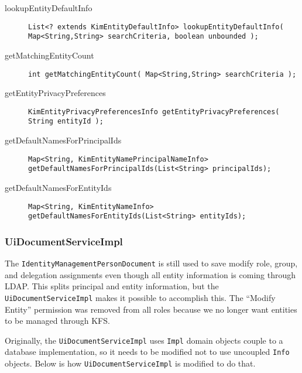\documentclass[12pt,notitlepage]{article}
\begin{document}
\begin{description}
\item[lookupEntityDefaultInfo]
\begin{lstlisting}
List<? extends KimEntityDefaultInfo> lookupEntityDefaultInfo( Map<String,String> searchCriteria, boolean unbounded );
\end{lstlisting}

\item[getMatchingEntityCount]
\begin{lstlisting}
int getMatchingEntityCount( Map<String,String> searchCriteria );
\end{lstlisting}

\item[getEntityPrivacyPreferences]
\begin{lstlisting}
KimEntityPrivacyPreferencesInfo getEntityPrivacyPreferences( String entityId );
\end{lstlisting}

\item[getDefaultNamesForPrincipalIds]
\begin{lstlisting}
Map<String, KimEntityNamePrincipalNameInfo> getDefaultNamesForPrincipalIds(List<String> principalIds);
\end{lstlisting}

\item[getDefaultNamesForEntityIds]
\begin{lstlisting}
Map<String, KimEntityNameInfo> getDefaultNamesForEntityIds(List<String> entityIds);
\end{lstlisting}
\end{description}

\subsubsection{UiDocumentServiceImpl}
The \verb|IdentityManagementPersonDocument| is still used to save modify role, group, and delegation assignments
even though all entity information is coming through LDAP. This splits principal and entity information, but
the \verb|UiDocumentServiceImpl| makes it possible to accomplish this. The ``Modify Entity'' permission was
removed from all roles because we no longer want entities to be managed through KFS.

Originally, the \verb|UiDocumentServiceImpl|
uses \verb|Impl| domain objects couple to a database implementation, so it needs to be modified not to use uncoupled
\verb|Info| objects. Below is how \verb|UiDocumentServiceImpl| is modified to do that.
\end{document}
